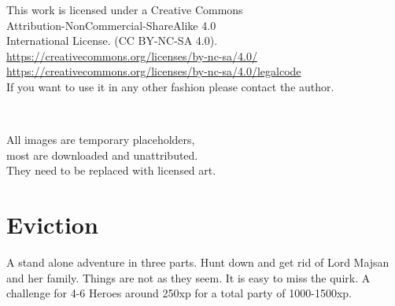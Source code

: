 \clearpage
\thispagestyle{empty}
\raggedbottom

\vsmall
\noindent
This work is licensed under a Creative Commons \\
Attribution-NonCommercial-ShareAlike 4.0 \\
International License. (CC BY-NC-SA 4.0).\\
\url{https://creativecommons.org/licenses/by-nc-sa/4.0/} \\
\url{https://creativecommons.org/licenses/by-nc-sa/4.0/legalcode} \\
If you want to use it in any other fashion please contact the author.

\

\noindent
All images are temporary placeholders, \\
most are downloaded and unattributed.\\
They need to be replaced with licensed art.

\normalsize






\cleardoublepage
\pagestyle{fancy}
\raggedbottom



\section*{Eviction}
A stand alone adventure in three parts. Hunt down and get rid of Lord Majsan and her family. Things are not as they seem. It is easy to miss the quirk. A challenge for 4-6 Heroes around 250xp for a total party of 1000-1500xp.

\vspace{1.0\baselineskip}

\tableofcontents
{}

\vspace{5.0\baselineskip}

